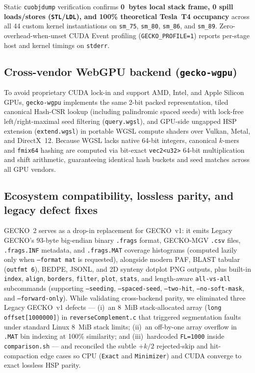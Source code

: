 \documentclass[pdflatex,sn-vancouver,Numbered]{sn-jnl}
\begin{document}
\begin{itemize}
\begin{itemize}
    \end{itemize}
    Static \texttt{cuobjdump} verification confirms \textbf{0~bytes local stack frame, 0 spill loads/stores (\texttt{STL}/\texttt{LDL}), and 100\% theoretical Tesla~T4 occupancy} across all 44 custom kernel instantiations on \texttt{sm\_75}, \texttt{sm\_80}, \texttt{sm\_86}, and \texttt{sm\_89}. Zero-overhead-when-unset CUDA Event profiling (\texttt{GECKO\_PROFILE=1}) reports per-stage host and kernel timings on \texttt{stderr}.
\end{itemize}

\subsection{Cross-vendor WebGPU backend (\texttt{gecko-wgpu})}\label{subsec:wgpu}

To avoid proprietary CUDA lock-in and support AMD, Intel, and Apple Silicon GPUs, \texttt{gecko-wgpu} implements the same 2-bit packed representation, tiled canonical Hash-CSR lookup (including palindromic spaced seeds) with lock-free left/right-maximal seed filtering (\texttt{query.wgsl}), and GPU-side ungapped HSP extension (\texttt{extend.wgsl}) in portable WGSL compute shaders over Vulkan, Metal, and DirectX~12. Because WGSL lacks native 64-bit integers, canonical $k$-mers and \texttt{fmix64} hashing are computed via bit-exact \texttt{vec2<u32>} 64-bit multiplication and shift arithmetic, guaranteeing identical hash buckets and seed matches across all GPU vendors.

\subsection{Ecosystem compatibility, lossless parity, and legacy defect fixes}\label{subsec:compat}

GECKO~2 serves as a drop-in replacement for GECKO~v1: it emits Legacy GECKO's 93-byte big-endian binary \texttt{.frags} format, GECKO-MGV \cite{diazdelpino2019geckomgv} \texttt{.csv} files, \texttt{.frags.INF} metadata, and \texttt{.frags.MAT} coverage histograms (computed lazily only when \texttt{--format mat} is requested), alongside modern PAF, BLAST tabular (\texttt{outfmt~6}), BEDPE, JSONL, and 2D synteny dotplot PNG outputs, plus built-in \texttt{index}, \texttt{align}, \texttt{borders}, \texttt{filter}, \texttt{plot}, \texttt{stats}, and length-aware \texttt{all-vs-all} subcommands (supporting \texttt{--seeding}, \texttt{--spaced-seed}, \texttt{--two-hit}, \texttt{--no-soft-mask}, and \texttt{--forward-only}). While validating cross-backend parity, we eliminated three Legacy GECKO~v1 defects --- (i)~an 8~MiB stack-allocated array (\texttt{long offset[1000000]}) in \texttt{reverseComplement.c} that triggered segmentation faults under standard Linux 8~MiB stack limits; (ii)~an off-by-one array overflow in \texttt{.MAT} bin indexing at 100\% similarity; and (iii)~hardcoded \texttt{FL=1000} inside \texttt{comparison.sh} --- and reconciled the subtle $+k/2$ rejected-skip and hit-compaction edge cases so CPU (\texttt{Exact} and \texttt{Minimizer}) and CUDA converge to exact lossless HSP parity.
\end{document}
